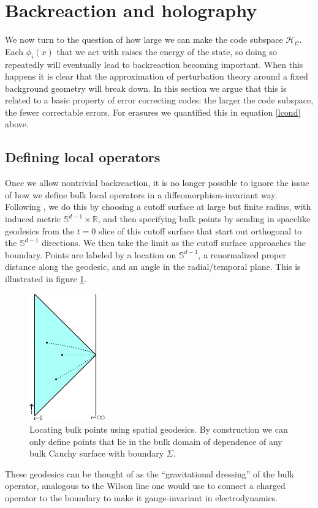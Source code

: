 \documentclass[11pt]{article}
\newcommand{\HC}{\mathcal{H}_{\mathcal{C}}}
\begin{document}
\section{Backreaction and holography}\label{backreactsec}
We now turn to the question of how large we can make the code subspace $\HC$.  Each $\phi_i(x)$ that we act with raises the energy of the state, so doing so repeatedly will eventually lead to backreaction becoming important.  When this happens it is clear that the approximation of perturbation theory around a fixed background geometry will break down.  In this section we argue that this is related to a basic property of error correcting codes: the larger the code subspace, the fewer correctable errors.  For erasures we quantified this in equation \eqref{lcond} above.  

\subsection{Defining local operators}
Once we allow nontrivial backreaction, it is no longer possible to ignore the issue of how we define bulk local operators in a diffeomorphism-invariant way.  Following \cite{Heemskerk:2012np,Kabat:2013wga}, we do this by choosing a cutoff surface at large but finite radius, with induced metric $\mathbb{S}^{d-1}\times \mathbb{R}$, and then specifying bulk points by sending in spacelike geodesics from the $t=0$ slice of this cutoff surface that start out orthogonal to the $\mathbb{S}^{d-1}$ directions.  We then take the limit as the cutoff surface approaches the boundary.  Points are labeled by a location on $\mathbb{S}^{d-1}$, a renormalized proper distance along the geodesic, and an angle in the radial/temporal plane.  This is illustrated in figure \ref{findpoints}. 
\begin{figure}
\begin{center}
\includegraphics[height=5.5cm]{findpoints.pdf}
\caption{Locating bulk points using spatial geodesics.  By construction we can only define points that lie in the bulk domain of dependence of any bulk Cauchy surface with boundary $\Sigma$.}\label{findpoints}
\end{center}
\end{figure}
These geodesics can be thought of as the ``gravitational dressing'' of the bulk operator, analogous to the Wilson line one would use to connect a charged operator to the boundary to make it gauge-invariant in electrodynamics.  
\end{document}
